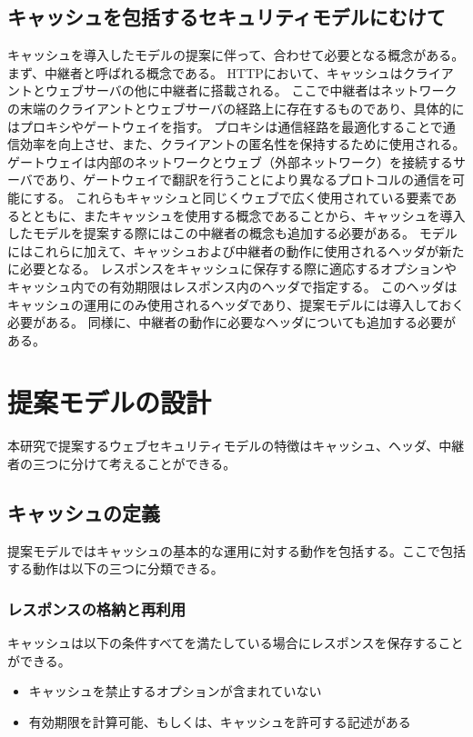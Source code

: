 \documentclass{css}
\begin{document}
\subsection{キャッシュを包括するセキュリティモデルにむけて}
キャッシュを導入したモデルの提案に伴って、合わせて必要となる概念がある。
まず、中継者と呼ばれる概念である。
HTTPにおいて、キャッシュはクライアントとウェブサーバの他に中継者に搭載される。
ここで中継者はネットワークの末端のクライアントとウェブサーバの経路上に存在するものであり、具体的にはプロキシやゲートウェイを指す。
プロキシは通信経路を最適化することで通信効率を向上させ、また、クライアントの匿名性を保持するために使用される。
ゲートウェイは内部のネットワークとウェブ（外部ネットワーク）を接続するサーバであり、ゲートウェイで翻訳を行うことにより異なるプロトコルの通信を可能にする。
これらもキャッシュと同じくウェブで広く使用されている要素であるとともに、またキャッシュを使用する概念であることから、キャッシュを導入したモデルを提案する際にはこの中継者の概念も追加する必要がある。
モデルにはこれらに加えて、キャッシュおよび中継者の動作に使用されるヘッダが新たに必要となる。
レスポンスをキャッシュに保存する際に適応するオプションやキャッシュ内での有効期限はレスポンス内のヘッダで指定する。
このヘッダはキャッシュの運用にのみ使用されるヘッダであり、提案モデルには導入しておく必要がある。
同様に、中継者の動作に必要なヘッダについても追加する必要がある。

\section{提案モデルの設計}
\label{sec:proposed}
本研究で提案するウェブセキュリティモデルの特徴はキャッシュ、ヘッダ、中継者の三つに分けて考えることができる。

\subsection{キャッシュの定義}
\label{cache}
提案モデルではキャッシュの基本的な運用に対する動作を包括する。ここで包括する動作は以下の三つに分類できる。

\subsubsection{レスポンスの格納と再利用}
\label{sec:store_reuse}
キャッシュは以下の条件すべてを満たしている場合にレスポンスを保存することができる。
\begin{itemize}
\item キャッシュを禁止するオプションが含まれていない
\item 有効期限を計算可能、もしくは、キャッシュを許可する記述がある
\end{itemize}
\end{document}
